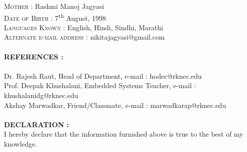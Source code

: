 \documentclass[12pt]{article}
\begin{document}
	\textsc{Mother : }Rashmi Manoj Jagyasi\\
	\textsc{Date of Birth : }7\textsuperscript{th} August, 1998\\
	\textsc{Languages Known : }English, Hindi, Sindhi, Marathi\\
	\textsc{Alternate e-mail address : }nikitajagyasi@gmail.com\\
	\\
	\textbf{\textsc{REFERENCES : }}\\
	\\
	Dr. Rajesh Raut, Head of Department, e-mail : hodec@rknec.edu\\
	Prof. Deepak Khushalani, Embedded Systems Teacher, e-mail : khushalanidg@rknec.edu\\
	Akshay Marwadkar, Friend/Classmate, e-mail : marwadkarap@rknec.edu\\
	\\
	\textbf{\textsc{DECLARATION : }}\\
	I hereby declare that the information furnished above is true to the best of my knowledge.\\
	\\
\end{document}

